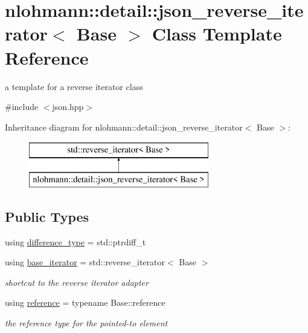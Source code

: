 \hypertarget{classnlohmann_1_1detail_1_1json__reverse__iterator}{}\section{nlohmann\+::detail\+::json\+\_\+reverse\+\_\+iterator$<$ Base $>$ Class Template Reference}
\label{classnlohmann_1_1detail_1_1json__reverse__iterator}


a template for a reverse iterator class  




{\ttfamily \#include $<$json.\+hpp$>$}

Inheritance diagram for nlohmann\+::detail\+::json\+\_\+reverse\+\_\+iterator$<$ Base $>$\+:\begin{figure}[H]
\begin{center}
\leavevmode
\includegraphics[height=2.000000cm]{de/d74/classnlohmann_1_1detail_1_1json__reverse__iterator}
\end{center}
\end{figure}
\subsection*{Public Types}
\begin{DoxyCompactItemize}
\item 
using \mbox{\hyperlink{classnlohmann_1_1detail_1_1json__reverse__iterator_a9ab55987c05ec6427ad36082e351cc45}{difference\+\_\+type}} = std\+::ptrdiff\+\_\+t
\item 
using \mbox{\hyperlink{classnlohmann_1_1detail_1_1json__reverse__iterator_a6b2ef1d632fe49bfcc22fbd1abd62395}{base\+\_\+iterator}} = std\+::reverse\+\_\+iterator$<$ Base $>$
\begin{DoxyCompactList}\small\item\em shortcut to the reverse iterator adapter \end{DoxyCompactList}\item 
using \mbox{\hyperlink{classnlohmann_1_1detail_1_1json__reverse__iterator_a42f51a69bac7b2aebb613b2164e457f1}{reference}} = typename Base\+::reference
\begin{DoxyCompactList}\small\item\em the reference type for the pointed-\/to element \end{DoxyCompactList}\end{DoxyCompactItemize}
